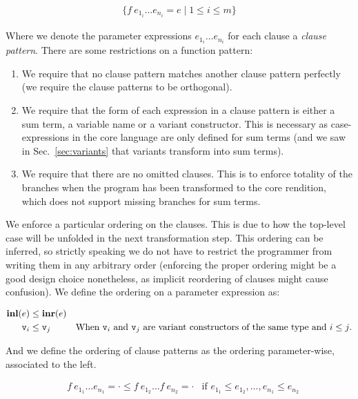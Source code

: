 \begin{align*}
\{ f~e_{1_i} \dots e_{n_i} = e \mid 1 \le i \le m \}
\end{align*}

Where we denote the parameter expressions $e_{1_i} \dots e_{n_i}$ for each
clause a \emph{clause pattern}. There are some restrictions on a function
pattern:

\begin{enumerate}

  \item We require that no clause pattern matches another clause pattern
    perfectly (we require the clause patterns to be orthogonal).

  \item We require that the form of each expression in a clause pattern is
    either a sum term, a variable name or a variant constructor. This is
    necessary as case-expressions in the core language are only defined for sum
    terms (and we saw in Sec.~\ref{sec:variants} that variants transform into
    sum terms).

  \item We require that there are no omitted clauses. This is to enforce
    totality of the branches when the program has been transformed to the core
    rendition, which does not support missing branches for sum terms.

\end{enumerate}

We enforce a particular ordering on the clauses. This is due to how the
top-level case will be unfolded in the next transformation step. This ordering
can be inferred, so strictly speaking we do not have to restrict the programmer
from writing them in any arbitrary order (enforcing the proper ordering might
be a good design choice nonetheless, as implicit reordering of clauses might
cause confusion). We define the ordering on a parameter expression as:

\begin{align*}
  \textbf{inl}(e) &\le \textbf{inr}(e) & \\
  \texttt{v}_i &\le \texttt{v}_j
    & \text{When $\texttt{v}_i$ and $\texttt{v}_j$ are variant constructors of
            the same type and $i \le j$.} \end{align*}

And we define the ordering of clause patterns as the ordering parameter-wise,
associated to the left.

\begin{align*}
    & f~e_{1_1} \dots e_{n_1} = \cdot
  \le f~e_{1_2} \dots f~e_{n_2} = \cdot &
  \text{if $e_{1_1} \le e_{1_2}, \dots, e_{n_1} \le e_{n_2}$}
\end{align*}

